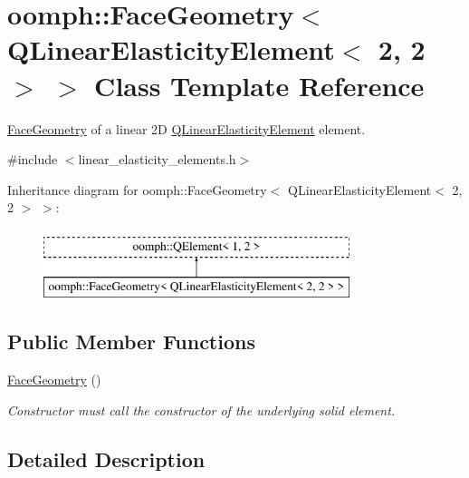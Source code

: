 \hypertarget{classoomph_1_1FaceGeometry_3_01QLinearElasticityElement_3_012_00_012_01_4_01_4}{}\section{oomph\+:\+:Face\+Geometry$<$ Q\+Linear\+Elasticity\+Element$<$ 2, 2 $>$ $>$ Class Template Reference}
\label{classoomph_1_1FaceGeometry_3_01QLinearElasticityElement_3_012_00_012_01_4_01_4}


\hyperlink{classoomph_1_1FaceGeometry}{Face\+Geometry} of a linear 2D \hyperlink{classoomph_1_1QLinearElasticityElement}{Q\+Linear\+Elasticity\+Element} element.  




{\ttfamily \#include $<$linear\+\_\+elasticity\+\_\+elements.\+h$>$}

Inheritance diagram for oomph\+:\+:Face\+Geometry$<$ Q\+Linear\+Elasticity\+Element$<$ 2, 2 $>$ $>$\+:\begin{figure}[H]
\begin{center}
\leavevmode
\includegraphics[height=2.000000cm]{classoomph_1_1FaceGeometry_3_01QLinearElasticityElement_3_012_00_012_01_4_01_4}
\end{center}
\end{figure}
\subsection*{Public Member Functions}
\begin{DoxyCompactItemize}
\item 
\hyperlink{classoomph_1_1FaceGeometry_3_01QLinearElasticityElement_3_012_00_012_01_4_01_4_ab8f1f093312b67aa7aa0777828fc6802}{Face\+Geometry} ()
\begin{DoxyCompactList}\small\item\em Constructor must call the constructor of the underlying solid element. \end{DoxyCompactList}\end{DoxyCompactItemize}


\subsection{Detailed Description}
